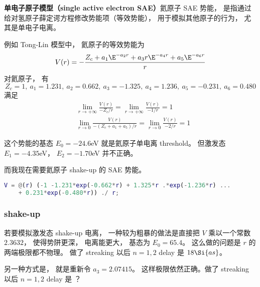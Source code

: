 
\begin{issues}
\issueDraft
\end{issues}

\textbf{单电子原子模型（single active electron SAE）}氦原子 SAE 势能， 是指通过给对氢原子薛定谔方程修改势能项（等效势能）， 用于模拟其他原子的行为， 尤其是单电子电离。

例如 Tong-Lin 模型中， 氦原子的等效势能为
\begin{equation}
V(r) = -\frac{Z_c + a_1 \E^{-a_2 r} + a_3 r \E^{-a_4 r} + a_5 \E^{-a_6 r}}{r}
\end{equation}
对氦原子， 有
\begin{equation}
Z_c = 1, \ a_1 = 1.231,\ a_2 = 0.662,\ a_3 = -1.325,\ a_4 = 1.236,\ a_5 = -0.231,\ a_6 = 0.480
\end{equation}
满足
\begin{align}
&\lim_{r\to +\infty} \frac{V(r)}{-Z_c/r} = \lim_{r\to +\infty} \frac{V(r)}{-1/r} = 1\\
&\lim_{r\to 0} \frac{V(r)}{-(Z_c + a_1 + a_5)/r} = \lim_{r\to 0} \frac{V(r)}{-2/r} = 1
\end{align}

这个势能的基态 $E_0 = -24.6$eV 就是氦原子单电离 threshold。 但激发态 $E_1 = -4.35$eV， $E_2 = -1.70$eV 并不正确。

而我现在需要氦原子 shake-up 的 SAE 势能。

\begin{lstlisting}[language=matlab]
V = @(r) (-1 -1.231*exp(-0.662*r) + 1.325*r .*exp(-1.236*r) ...
    + 0.231*exp(-0.480*r)) ./ r;
\end{lstlisting}

\subsubsection{shake-up}
若要模拟激发态 shake-up 电离， 一种较为粗暴的做法是直接把 $V$ 乘以一个常数 $2.3632$， 使得势阱更深， 电离能更大， 基态为 $E_0 = 65.4$。 这么做的问题是 $r$ 的两端极限都不物理。 做了 streaking 以后 $n=1,2$ delay 是 $18\Si{as}$。

另一种方式是， 就是重新令 $a_3 = 2.07415$。 这样极限依然正确。做了 streaking 以后 $n=1,2$ delay 是 ？
